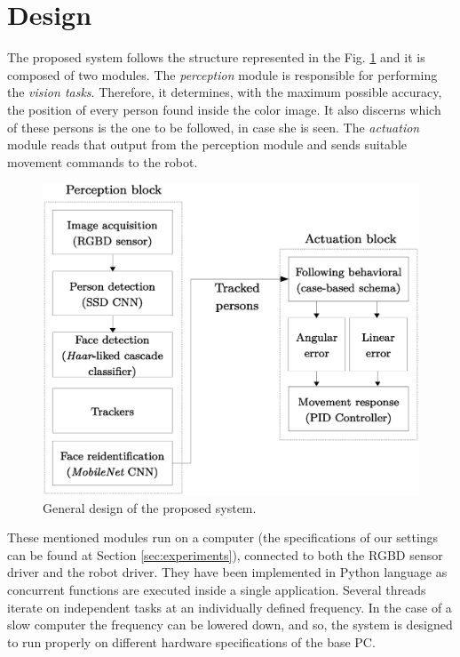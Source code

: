 \section{Design}

The proposed system follows the structure represented in the Fig. \ref{fig:infra_scheme} and it is composed of two modules. The \emph{perception} module is responsible for performing the \emph{vision tasks}. Therefore, it determines, with the maximum possible accuracy, the position of every person found inside the color image. It also discerns which of these persons is the one to be followed, in case she is seen. The \emph{actuation} module reads that output from the perception module and sends suitable movement commands to the robot.

\begin{figure}[h]
	\centering
	\includegraphics[width=12cm]{images/system_schema}
	\caption{General design of the proposed system.}
	\label{fig:infra_scheme}
\end{figure}

These mentioned modules run on a computer (the specifications of our settings can be found at Section \ref{sec:experiments}), connected to both the RGBD sensor driver and the robot driver. They have been implemented in Python language as concurrent functions are executed inside a single application. Several threads iterate on independent tasks at an individually defined frequency. In the case of a slow computer the frequency can be lowered down, and so, the system is designed to run properly on different hardware specifications of the base PC.
